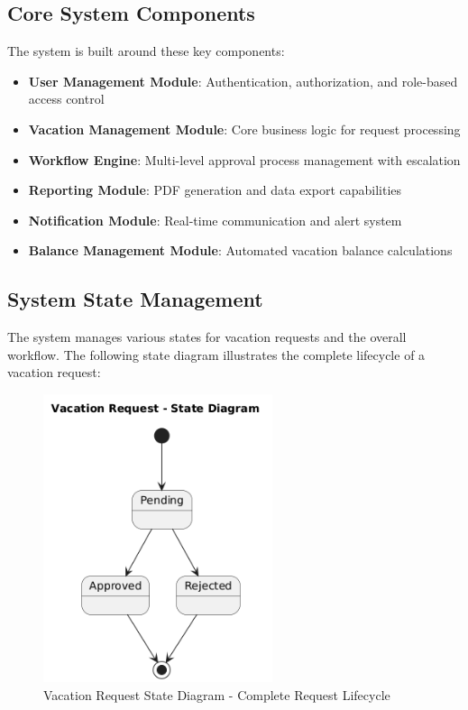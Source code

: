 \documentclass[12pt,a4paper]{article}
\begin{document}
\subsection{Core System Components}
The system is built around these key components:

\begin{itemize}
    \item \textbf{User Management Module}: Authentication, authorization, and role-based access control
    \item \textbf{Vacation Management Module}: Core business logic for request processing
    \item \textbf{Workflow Engine}: Multi-level approval process management with escalation
    \item \textbf{Reporting Module}: PDF generation and data export capabilities
    \item \textbf{Notification Module}: Real-time communication and alert system
    \item \textbf{Balance Management Module}: Automated vacation balance calculations
\end{itemize}

\subsection{System State Management}
The system manages various states for vacation requests and the overall workflow. The following state diagram illustrates the complete lifecycle of a vacation request:

\begin{figure}[H]
\centering
\includegraphics[width=0.6\textwidth]{Diagrams/State-Diagram/State-Diagram.png}
\caption{Vacation Request State Diagram - Complete Request Lifecycle}
\label{fig:state-diagram}
\end{figure}
\end{document}

